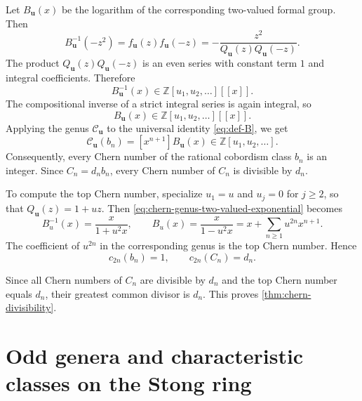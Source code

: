 \documentclass[14pt,dvipsnames]{extarticle}
\numberwithin{equation}{subsection}
\theoremstyle{plain}
\theoremstyle{definition}
\theoremstyle{definition}
\begin{document}
Let $B_{\boldsymbol u}(x)$ be the logarithm of the corresponding two-valued
formal group. Then
\begin{equation}\label{eq:chern-genus-two-valued-exponential}
 B_{\boldsymbol u}^{-1}(-z^2)
 =f_{\boldsymbol u}(z)f_{\boldsymbol u}(-z)
 =-\frac{z^2}{Q_{\boldsymbol u}(z)Q_{\boldsymbol u}(-z)}.
\end{equation}
The product $Q_{\boldsymbol u}(z)Q_{\boldsymbol u}(-z)$ is an even series with
constant term $1$ and integral coefficients. Therefore
\[
 B_{\boldsymbol u}^{-1}(x)
 \in\mathbb Z[u_1,u_2,\ldots][[x]].
\]
The compositional inverse of a strict integral series is again integral, so
\begin{equation}\label{eq:chern-genus-logarithm-integral}
 B_{\boldsymbol u}(x)
 \in\mathbb Z[u_1,u_2,\ldots][[x]].
\end{equation}
Applying the genus $\mathcal C_{\boldsymbol u}$ to the universal identity \eqref{eq:def-B}, we get
\begin{equation}\label{eq:chern-genus-bn}
 \mathcal C_{\boldsymbol u}(b_n)
 =[x^{n+1}]B_{\boldsymbol u}(x)
 \in\mathbb Z[u_1,u_2,\ldots].
\end{equation}
Consequently, every Chern number of the rational cobordism class $b_n$ is an
integer. Since $C_n=d_nb_n$, every Chern number of $C_n$ is divisible by
$d_n$.

To compute the top Chern number, specialize $u_1=u$ and $u_j=0$ for $j\geq2$,
so that $Q_{\boldsymbol u}(z)=1+uz$.
Then \eqref{eq:chern-genus-two-valued-exponential} becomes
\[
 B_u^{-1}(x)=\frac{x}{1+u^2x},
 \qquad
 B_u(x)=\frac{x}{1-u^2x}
       =x+\sum_{n\geq1}u^{2n}x^{n+1}.
\]
The coefficient of $u^{2n}$ in the corresponding genus is the top Chern
number. Hence
\[
 c_{2n}(b_n)=1,
 \qquad
 c_{2n}(C_n)=d_n.
\]

Since all Chern numbers of $C_n$ are divisible by $d_n$ and the top Chern
number equals $d_n$, their greatest common divisor is $d_n$. This proves
\cref{thm:chern-divisibility}.













\section{Odd genera and characteristic classes on the Stong ring}\label{sec:odd-genera}
\end{document}
